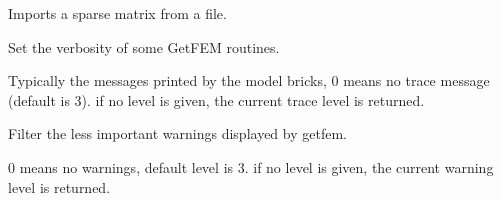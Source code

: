 \documentclass[a4paper,11pt,english]{sphinxmanual}
\begin{document}

\begin{fulllineitems}
\label{\detokenize{python/cmdref_Module util:getfem.util_load_matrix}}
Imports a sparse matrix from a file.

\end{fulllineitems}


\begin{fulllineitems}
\label{\detokenize{python/cmdref_Module util:getfem.util_trace_level}}
Set the verbosity of some GetFEM routines.

Typically the messages printed by the model bricks, 0 means no
trace message (default is 3). if no level is given,
the current trace level is returned.

\end{fulllineitems}


\begin{fulllineitems}
\label{\detokenize{python/cmdref_Module util:getfem.util_warning_level}}
Filter the less important warnings displayed by getfem.

0 means no warnings, default level is 3. if no level is given,
the current warning level is returned.

\end{fulllineitems}




\renewcommand{\indexname}{Index}
\printindex
\end{document}
